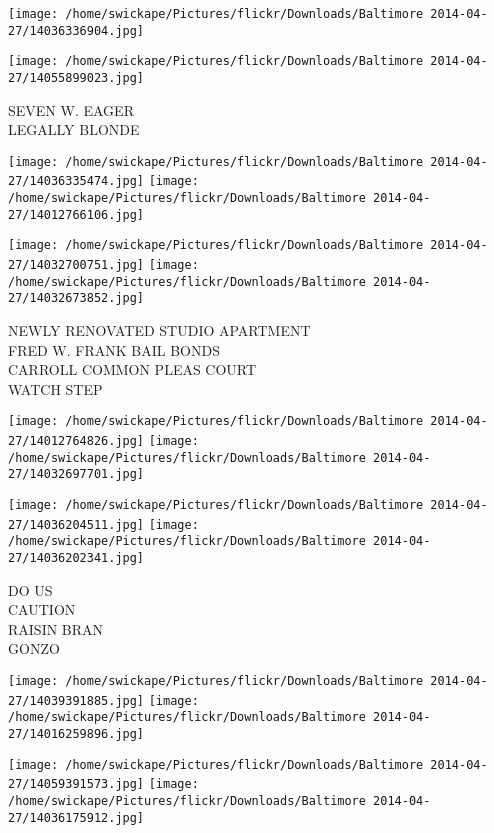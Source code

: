 \documentclass[10pt,letterpaper]{article}
\begin{document}
\texttt{[image: /home/swickape/Pictures/flickr/Downloads/Baltimore 2014-04-27/14036336904.jpg]}

\vspace{0.25in}
\texttt{[image: /home/swickape/Pictures/flickr/Downloads/Baltimore 2014-04-27/14055899023.jpg]}

SEVEN W. EAGER\\
LEGALLY BLONDE\\
\pagebreak

\texttt{[image: /home/swickape/Pictures/flickr/Downloads/Baltimore 2014-04-27/14036335474.jpg]}
\texttt{[image: /home/swickape/Pictures/flickr/Downloads/Baltimore 2014-04-27/14012766106.jpg]}

\texttt{[image: /home/swickape/Pictures/flickr/Downloads/Baltimore 2014-04-27/14032700751.jpg]}
\texttt{[image: /home/swickape/Pictures/flickr/Downloads/Baltimore 2014-04-27/14032673852.jpg]}

NEWLY RENOVATED STUDIO APARTMENT\\
FRED W. FRANK BAIL BONDS\\
CARROLL COMMON PLEAS COURT\\
WATCH STEP\\
\pagebreak

\texttt{[image: /home/swickape/Pictures/flickr/Downloads/Baltimore 2014-04-27/14012764826.jpg]}
\texttt{[image: /home/swickape/Pictures/flickr/Downloads/Baltimore 2014-04-27/14032697701.jpg]}

\texttt{[image: /home/swickape/Pictures/flickr/Downloads/Baltimore 2014-04-27/14036204511.jpg]}
\texttt{[image: /home/swickape/Pictures/flickr/Downloads/Baltimore 2014-04-27/14036202341.jpg]}

DO US\\
CAUTION\\
RAISIN BRAN\\
GONZO\\
\pagebreak

\texttt{[image: /home/swickape/Pictures/flickr/Downloads/Baltimore 2014-04-27/14039391885.jpg]}
\texttt{[image: /home/swickape/Pictures/flickr/Downloads/Baltimore 2014-04-27/14016259896.jpg]}

\texttt{[image: /home/swickape/Pictures/flickr/Downloads/Baltimore 2014-04-27/14059391573.jpg]}
\texttt{[image: /home/swickape/Pictures/flickr/Downloads/Baltimore 2014-04-27/14036175912.jpg]}
\end{document}
